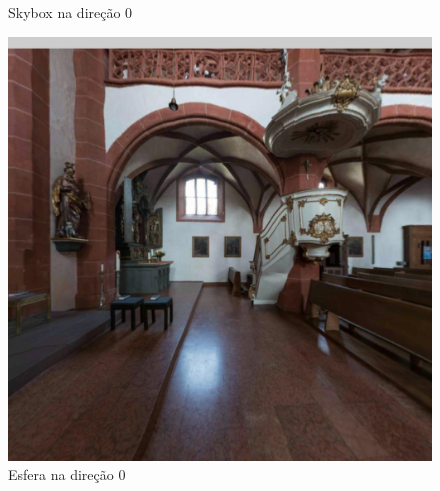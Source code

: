 \documentclass[conference]{IEEEtran}
\begin{document}
\begin{figure}[!tbp]
\begin{minipage}[b]{0.3\textwidth}
    \caption{Skybox na direção 0}
    \label{fig:equisphere}
  \end{minipage}
  \hfill
  \begin{minipage}[b]{0.3\textwidth}
    \centering
    \includegraphics[width=1.1\textwidth]{../images/screenshots/Screenshot_0_Sphere}
    \caption{Esfera na direção 0}
    \label{fig:equisphere}
  \end{minipage}
\end{figure}
\end{document}
